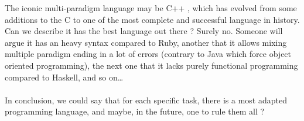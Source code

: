 \documentclass[a4paper]{article}
\newcommand{\cpp}{%
\textsc{C++}%
}
\begin{document}
The iconic multi-paradigm language may be \cpp, which has evolved from some additions to the \textsc{C} to one of the most complete and successful language in history. Can we describe it has the best language out there ? Surely no. Someone will argue it has an heavy syntax compared to Ruby, another that it allows mixing multiple paradigm ending in a lot of errors (contrary to Java which force object oriented programming), the next one that it lacks purely functional programming compared to Haskell, and so on\ldots

\paragraph{}

In conclusion, we could say that for each specific task, there is a most adapted programming language, and maybe, in the future, one to rule them all ?
\newpage


\end{document}
